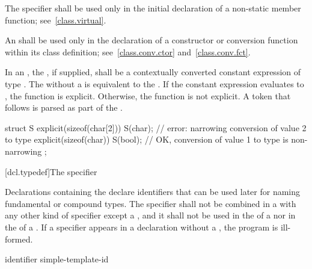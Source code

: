 \pnum
{}%
The  specifier shall be used only in the initial
declaration of a non-static member function; see~\ref{class.virtual}.

\pnum
{}%
An  shall be used only in the declaration of
a constructor or conversion function within its class definition;
see~\ref{class.conv.ctor} and~\ref{class.conv.fct}.

\pnum
In an ,
the , if supplied, shall be a
contextually converted constant expression of type .
The  
without a  is equivalent to
the  .
If the constant expression evaluates to ,
the function is explicit. Otherwise, the function is not explicit.
A \tcode{(} token that follows  is parsed as
part of the .
\begin{example}
\begin{codeblock}
struct S {
  explicit(sizeof(char[2])) S(char);    // error: narrowing conversion of value 2 to type 
  explicit(sizeof(char)) S(bool);       // OK, conversion of value 1 to type  is non-narrowing
};
\end{codeblock}
\end{example}

[dcl.typedef]{The  specifier}%

\pnum
Declarations containing the  
declare identifiers that can be used later for naming
fundamental or compound
types. The  specifier shall not be
combined in a  with any other kind of
specifier except a , and it shall not be used in the
 of a
 nor in the
 of a
.
If a  specifier appears in a declaration without a ,
the program is ill-formed.

\begin{bnf}
\br
    identifier\br
    simple-template-id
\end{bnf}

